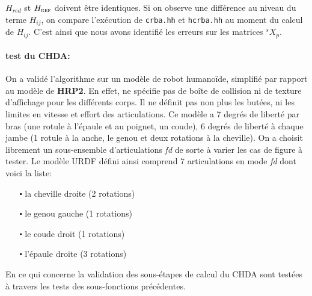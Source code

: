 \documentclass{report}
\begin{document}
$H_{red}$ st $H_{\textsc{ref}}$ doivent être identiques. Si on observe une différence au niveau du terme $H_{ij}$, on compare l'exécution de \verb;crba.hh; et \verb;hcrba.hh; au moment du calcul de $H_{ij}$. C'est ainsi que nous avons identifié les erreurs sur les matrices $^sX_p$.

\paragraph{test du CHDA:}

On a validé l'algorithme sur un modèle de robot humanoïde, simplifié par rapport au modèle de \textbf{HRP2}. En effet, ne spécifie pas de boîte de collision ni de texture d'affichage pour les différents corps. Il ne définit pas non plus les butées, ni les limites en vitesse et effort des articulations. Ce modèle a 7 degrés de liberté par bras (une rotule à l'épaule et au poignet, un coude), 6 degrés de liberté à chaque jambe (1 rotule à la anche, le genou et deux rotations à la cheville). On a choisit librement un sous-ensemble d'articulations \emph{fd} de sorte à varier les cas de figure à tester. Le modèle URDF défini ainsi comprend 7 articulations en mode \emph{fd} dont voici la liste:
\begin{itemize}
\item[$\centerdot$] la cheville droite (2 rotations)
\item[$\centerdot$] le genou gauche (1 rotations)
\item[$\centerdot$] le coude droit (1 rotations)
\item[$\centerdot$] l'épaule droite (3 rotations)
\end{itemize}

En ce qui concerne la validation des sous-étapes de calcul du CHDA sont testées à travers les tests des sous-fonctions précédentes.
\end{document}
